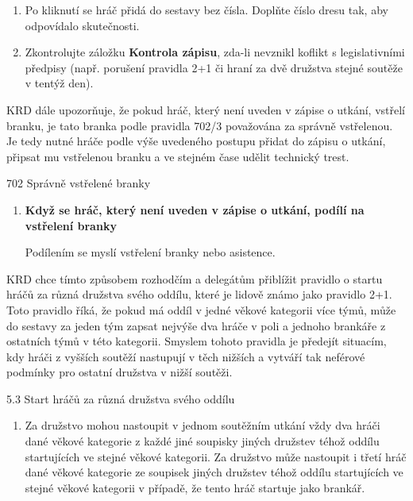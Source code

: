 \documentclass{newsletter_2025}
\begin{document}
\begin{enumerate}
\begin{figure}[h]
	\end{figure}
	\item Po kliknutí se hráč přidá do sestavy bez čísla. Doplňte číslo dresu tak, aby odpovídalo skutečnosti.
	\item Zkontrolujte záložku \textbf{Kontrola zápisu}, zda-li nevznikl koflikt s legislativními předpisy (např. porušení pravidla 2+1 či hraní za dvě družstva stejné soutěže v tentýž den).
\end{enumerate}

KRD dále upozorňuje, že pokud hráč, který není uveden v zápise o utkání, vstřelí branku, je tato branka podle pravidla 702/3 považována za správně vstřelenou. Je tedy nutné hráče podle výše uvedeného postupu přidat do zápisu o utkání, připsat mu vstřelenou branku a ve stejném čase udělit technický trest.

\begin{admonition-quote}{702 Správně vstřelené branky}
	\begin{enumerate}\addtocounter{enumi}{2}
		\item \textbf{Když se hráč, který není uveden v zápise o utkání, podílí na vstřelení branky}
		
		\begin{flushleft}
			Podílením se myslí vstřelení branky nebo asistence.
		\end{flushleft}
	\end{enumerate}
\end{admonition-quote}

\clearpage
{}
KRD chce tímto způsobem rozhodčím a delegátům přiblížit pravidlo o startu hráčů za různá družstva svého oddílu, které je lidově známo jako pravidlo 2+1. Toto pravidlo říká, že pokud má oddíl v jedné věkové kategorii více týmů, může do sestavy za jeden tým zapsat nejvýše dva hráče v poli a jednoho brankáře z ostatních týmů v této kategorii. Smyslem tohoto pravidla je předejít situacím, kdy hráči z vyšších soutěží nastupují v těch nižších a vytváří tak neférové podmínky pro ostatní družstva v nižší soutěži.

\begin{admonition-quote}{5.3 Start hráčů za různá družstva svého oddílu}
	\begingroup
	\renewcommand{\theenumi}{\alph{enumi}}
	\begin{enumerate}\addtocounter{enumi}{2}
		\item Za družstvo mohou nastoupit v jednom soutěžním utkání vždy dva hráči dané věkové
		kategorie z každé jiné soupisky jiných družstev téhož oddílu startujících ve stejné
		věkové kategorii. Za družstvo může nastoupit i třetí hráč dané věkové kategorie ze
		soupisek jiných družstev téhož oddílu startujících ve stejné věkové kategorii v případě,
		že tento hráč startuje jako brankář.
	\end{enumerate}
	\endgroup
\end{admonition-quote}
\end{document}
